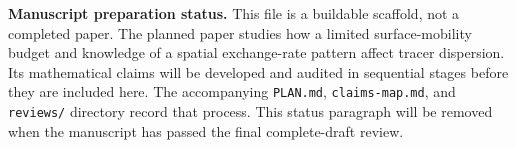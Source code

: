 \noindent\textbf{Manuscript preparation status.}
This file is a buildable scaffold, not a completed paper.
The planned paper studies how a limited surface-mobility budget and knowledge
of a spatial exchange-rate pattern affect tracer dispersion. Its mathematical
claims will be developed and audited in sequential stages before they are
included here. The accompanying \texttt{PLAN.md}, \texttt{claims-map.md}, and
\texttt{reviews/} directory record that process. This status paragraph will be
removed when the manuscript has passed the final complete-draft review.
